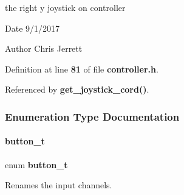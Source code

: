 the right y joystick on controller 

\begin{DoxyDate}{Date}
9/1/2017 
\end{DoxyDate}
\begin{DoxyAuthor}{Author}
Chris Jerrett 
\end{DoxyAuthor}


Definition at line \textbf{ 81} of file \textbf{ controller.\+h}.



Referenced by \textbf{ get\+\_\+joystick\+\_\+cord()}.



\subsubsection{Enumeration Type Documentation}
\mbox{\label{a00011_a7754652ebe470fb6cc5d30b4cd258660}} 
\paragraph{button\+\_\+t}
{\footnotesize\ttfamily enum \textbf{ button\+\_\+t}}



Renames the input channels. 

